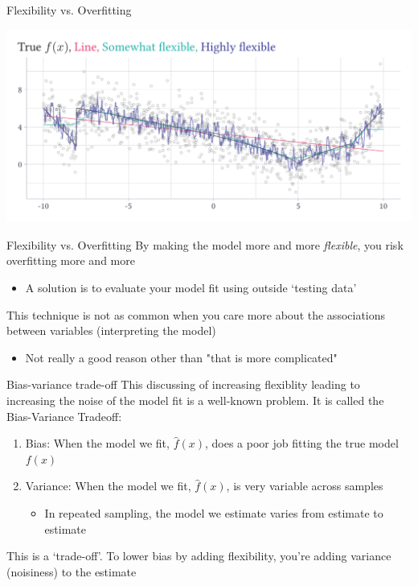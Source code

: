 \documentclass[aspectratio=169,t,11pt,table]{beamer}
\begin{document}
\begin{frame}{Flexibility vs. Overfitting}
  \vspace{-\bigskipamount}
  \begin{center}
    \includegraphics[width = \textwidth]{figures/f_examples_overfitting.pdf}
  \end{center}
\end{frame}

\begin{frame}{Flexibility vs. Overfitting}
  By making the model more and more \emph{flexible}, you risk overfitting more and more

  \begin{itemize}
    \item A solution is to evaluate your model fit using outside `testing data'
  \end{itemize}

  \pause
  \bigskip
  This technique is not as common when you care more about the associations between variables (interpreting the model)
  \begin{itemize}
    \item Not really a good reason other than "that is more complicated"
  \end{itemize}
\end{frame}


\begin{frame}{Bias-variance trade-off}
  This discussing of increasing flexiblity leading to increasing the noise of the model fit is a well-known problem. It is called the \alert{Bias-Variance Tradeoff}:
  \begin{enumerate}
    \item \alert{Bias}: When the model we fit, $\hat{f}(x)$, does a poor job fitting the true model $f(x)$
    
    \item \alert{Variance}: When the model we fit, $\hat{f}(x)$, is very variable across samples
    \begin{itemize}
      \item In repeated sampling, the model we estimate varies from estimate to estimate
    \end{itemize}
  \end{enumerate}

  \pause
  \bigskip
  This is a `trade-off'. To lower bias by adding flexibility, you're adding variance (noisiness) to the estimate 
\end{frame}
\end{document}
